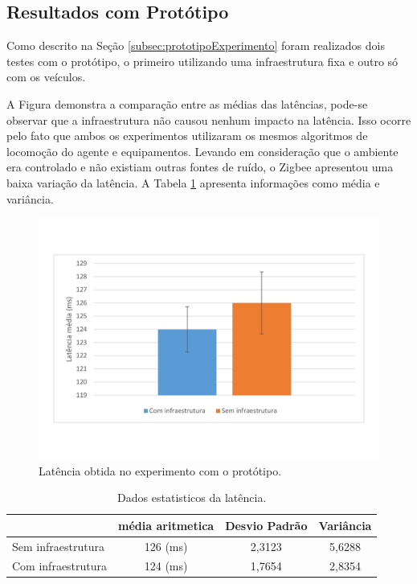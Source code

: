 \subsection{Resultados com Protótipo}

Como descrito na Seção \ref{subsec:prototipoExperimento} foram realizados dois testes com o protótipo, o primeiro utilizando uma infraestrutura fixa e outro só com os veículos.

A Figura demonstra a comparação entre as médias das latências, pode-se observar que a infraestrutura não causou nenhum impacto na latência. Isso ocorre pelo fato que ambos os experimentos utilizaram os mesmos algoritmos de locomoção do agente e equipamentos. Levando em consideração que o ambiente era controlado e não existiam outras fontes de ruído, o Zigbee apresentou uma baixa variação da latência. A Tabela \ref{tab:experimentoRealLatencia} apresenta informações como média e variância.


\begin{figure}[htbp]
	\centering
	\includegraphics[scale=0.4]{resultados/graficos/experimentoRealLatencia.pdf}
	\caption{Latência obtida no experimento com o protótipo.}
	\label{fig:experimentoRealLatencia}
\end{figure}


\begin{table}[ht]
	\caption{Dados estatisticos da latência.}
	\centering
	\begin{tabular}{ | l | c | c | c|}
		\hline
		& média aritmetica & Desvio Padrão & Variância \\ \hline
		Sem infraestrutura & 126 (ms) & 2,3123 & 5,6288  \\ \hline
		Com infraestrutura & 124 (ms) & 1,7654 & 2,8354 \\ \hline
	\end{tabular}
	\label{tab:experimentoRealLatencia}
\end{table}


